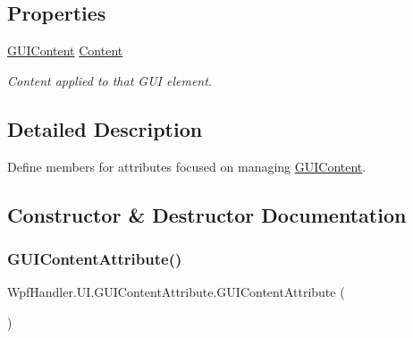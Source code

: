\subsection*{Properties}
\begin{DoxyCompactItemize}
\item 
\mbox{\hyperlink{class_wpf_handler_1_1_u_i_1_1_g_u_i_content}{G\+U\+I\+Content}} \mbox{\hyperlink{class_wpf_handler_1_1_u_i_1_1_g_u_i_content_attribute_a300bccba346680f1baa6812f557209c5}{Content}}
\begin{DoxyCompactList}\small\item\em Content applied to that G\+UI element. \end{DoxyCompactList}\end{DoxyCompactItemize}


\subsection{Detailed Description}
Define members for attributes focused on managing \mbox{\hyperlink{class_wpf_handler_1_1_u_i_1_1_g_u_i_content}{G\+U\+I\+Content}}. 



\subsection{Constructor \& Destructor Documentation}
\mbox{\label{class_wpf_handler_1_1_u_i_1_1_g_u_i_content_attribute_ac2a5bef97b1df0ab4dfd1e9764710d06}} 
\subsubsection{\texorpdfstring{G\+U\+I\+Content\+Attribute()}{GUIContentAttribute()}\hspace{0.1cm}{\footnotesize\ttfamily [1/5]}}
{\footnotesize\ttfamily Wpf\+Handler.\+U\+I.\+G\+U\+I\+Content\+Attribute.\+G\+U\+I\+Content\+Attribute (\begin{DoxyParamCaption}{ }\end{DoxyParamCaption})}



